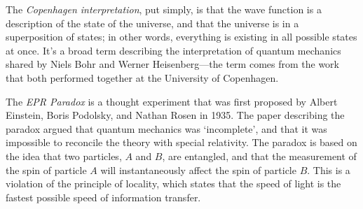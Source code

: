 
\begin{definition}
    The \emph{Copenhagen interpretation}, put simply, is that the wave function is a description of the state of the universe, and that the universe is in a superposition of states; in other words, everything is existing in all possible states at once. It's a broad term describing the interpretation of quantum mechanics shared by Niels Bohr and Werner Heisenberg---the term comes from the work that both performed together at the University of Copenhagen.
\end{definition}

\begin{definition}
    The \emph{EPR Paradox} is a thought experiment that was first proposed by Albert Einstein, Boris Podolsky, and Nathan Rosen in 1935. The paper describing the paradox argued that quantum mechanics was `incomplete', and that it was impossible to reconcile the theory with special relativity. The paradox is based on the idea that two particles, $A$ and $B$, are entangled, and that the measurement of the spin of particle $A$ will instantaneously affect the spin of particle $B$. This is a violation of the principle of locality, which states that the speed of light is the fastest possible speed of information transfer.
\end{definition}

